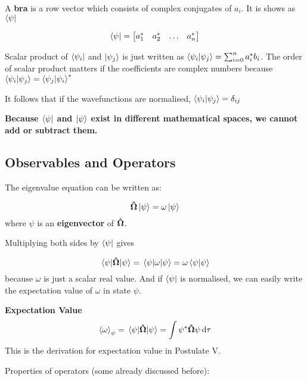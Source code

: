 \documentclass[11pt]{article}
\theoremstyle{definition}
\begin{document}
A \textbf{bra} is a row vector which consists of complex conjugates of $a_i$. It is shows as $\bra{\psi}$

\begin{equation}
   \bra{\psi}= \mqty[a_1^* & a_2^* & \dots & a_n^*]
\end{equation}

Scalar product of $\bra{\psi_i}$ and $\ket{\psi_j}$ is just written as $\bra{\psi_i}\ket{\psi_j} = \sum_{i=0}^n a_i^* b_i$. The order of scalar product matters if the coefficients are complex numbers because $\bra{\psi_i}\ket{\psi_j} =  \bra{\psi_j}\ket{\psi_i}^*$

It follows that if the wavefunctions are normalised,  $\bra{\psi_i}\ket{\psi_j} = \delta_{ij}$

\textbf{Because $\bra{\psi}$ and $\ket{\psi}$ exist in different mathematical spaces, we cannot add or subtract them.}

\subsection{Observables and Operators}

The eigenvalue equation can be written as:

\begin{equation*}
    \vectorunit{\Omega} \ket{\psi} = \omega \ket{\psi}
\end{equation*}
where $\psi$ is an \textbf{eigenvector} of $\vectorunit{\Omega}$.

Multiplying both sides by $\bra{\psi}$ gives

\begin{equation*}
    \ev{\vectorunit{\Omega}}{\psi} = \ev{\omega}{\psi} = \omega \bra{\psi}\ket{\psi}
\end{equation*}
because $\omega$ is just a scalar real value. And if $\bra{\psi}$ is normalised, we can easily write the expectation value of $\omega$ in state $\psi$.

\begin{shaded}
\textbf{Expectation Value}
\begin{equation*}
    \expval{\omega}_{\psi} =  \ev{\vectorunit{\Omega}}{\psi} = \int \psi^* \vectorunit{\Omega} \psi \dd{\tau}
\end{equation*}
This is the derivation for expectation value in Postulate V.
\end{shaded}

Properties of operators (some already discussed before):
\end{document}
